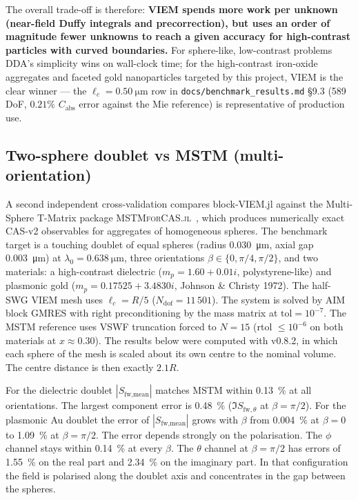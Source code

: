 \documentclass[11pt,a4paper]{article}
\begin{document}
The overall trade-off is therefore: \textbf{VIEM spends more work per
unknown (near-field Duffy integrals and precorrection), but uses an
order of magnitude fewer unknowns to reach a given accuracy for
high-contrast particles with curved boundaries.} For sphere-like,
low-contrast problems DDA's simplicity wins on wall-clock time; for
the high-contrast iron-oxide aggregates and faceted gold nanoparticles
targeted by this project, VIEM is the clear winner — the
$\ell_c = \SI{0.50}{\micro\metre}$ row in
\texttt{docs/benchmark\_results.md} \S 9.3 (589 DoF, $0.21\%$
$C_{\text{abs}}$ error against the Mie reference) is representative
of production use.

\subsection{Two-sphere doublet vs MSTM (multi-orientation)}
\label{sec:doublet-mstm}

A second independent cross-validation compares block-VIEM.jl against
the Multi-Sphere T-Matrix package
\textsc{MSTMforCAS.jl}~\cite{MSTMforCAS}, which produces numerically
exact CAS-v2 observables for aggregates of homogeneous spheres.  The
benchmark target is a touching doublet of equal spheres (radius
\SI{0.030}{\micro\metre}, axial gap \SI{0.003}{\micro\metre}) at
$\lambda_0 = \SI{0.638}{\micro\metre}$, three orientations $\beta
\in \{0, \pi/4, \pi/2\}$, and two materials: a high-contrast
dielectric ($m_p = 1.60 + 0.01 i$, polystyrene-like) and plasmonic
gold ($m_p = 0.17525 + 3.4830 i$, Johnson \& Christy 1972).  The
half-SWG VIEM mesh uses $\ell_c = R/5$
($N_{\text{dof}} = 11\,501$).
The system is solved by AIM block GMRES with right preconditioning by
the mass matrix at $\text{tol} = 10^{-7}$.
The MSTM reference uses VSWF truncation forced to $N = 15$
(rtol $\le 10^{-6}$ on both materials at $x \approx 0.30$).
The results below were computed with v0.8.2, in which each sphere of
the mesh is scaled about its own centre to the nominal volume.
The centre distance is then exactly $2.1 R$.

For the dielectric doublet $|S_{\text{fw,mean}}|$ matches MSTM within
\SI{0.13}{\percent} at all orientations.
The largest component error is \SI{0.48}{\percent}
($\Im S_{\text{fw},\theta}$ at $\beta = \pi/2$).
For the plasmonic Au doublet the error of $|S_{\text{fw,mean}}|$ grows
with $\beta$ from \SI{0.004}{\percent} at $\beta = 0$ to
\SI{1.09}{\percent} at $\beta = \pi/2$.
The error depends strongly on the polarisation.
The $\phi$ channel stays within \SI{0.14}{\percent} at every $\beta$.
The $\theta$ channel at $\beta = \pi/2$ has errors of
\SI{1.55}{\percent} on the real part and \SI{2.34}{\percent} on the
imaginary part.
In that configuration the field is polarised along the doublet axis
and concentrates in the gap between the spheres.
\end{document}
